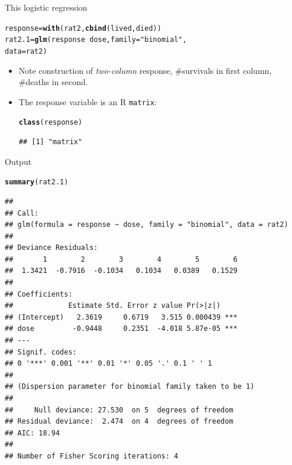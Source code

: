 \documentclass[unknownkeysallowed]{beamer}\usepackage[]{graphicx}\usepackage[]{color}
\makeatletter
\newcommand{\hlstr}[1]{\textcolor[rgb]{0.192,0.494,0.8}{#1}}%
\newcommand{\hlopt}[1]{\textcolor[rgb]{0,0,0}{#1}}%
\newcommand{\hlstd}[1]{\textcolor[rgb]{0.345,0.345,0.345}{#1}}%
\newcommand{\hlkwb}[1]{\textcolor[rgb]{0.69,0.353,0.396}{#1}}%
\newcommand{\hlkwc}[1]{\textcolor[rgb]{0.333,0.667,0.333}{#1}}%
\newcommand{\hlkwd}[1]{\textcolor[rgb]{0.737,0.353,0.396}{\textbf{#1}}}%
\newenvironment{kframe}{%
 \def\at@end@of@kframe{}%
 \ifinner\ifhmode%
  \def\at@end@of@kframe{\end{minipage}}%
  \begin{minipage}{\columnwidth}%
 \fi\fi%
 \def\FrameCommand##1{\hskip\@totalleftmargin \hskip-\fboxsep
 \colorbox{shadecolor}{##1}\hskip-\fboxsep
     \hskip-\linewidth \hskip-\@totalleftmargin \hskip\columnwidth}%
 \MakeFramed {\advance\hsize-\width
   \@totalleftmargin\z@ \linewidth\hsize
   \@setminipage}}%
 {\par\unskip\endMakeFramed%
 \at@end@of@kframe}
\newenvironment{knitrout}{}{} %
\makeatother
\begin{document}
\begin{frame}[fragile]{This logistic regression}
  
\begin{knitrout}
\color{fgcolor}\begin{kframe}
\begin{alltt}
\hlstd{response}\hlkwb{=}\hlkwd{with}\hlstd{(rat2,}\hlkwd{cbind}\hlstd{(lived,died))}
\hlstd{rat2.1}\hlkwb{=}\hlkwd{glm}\hlstd{(response}\hlopt{~}\hlstd{dose,}\hlkwc{family}\hlstd{=}\hlstr{"binomial"}\hlstd{,}
  \hlkwc{data}\hlstd{=rat2)}
\end{alltt}
\end{kframe}
\end{knitrout}
\begin{itemize}
\item Note construction of \emph{two-column} response, \#survivals in
  first column, \#deaths in second.
\item The response variable is an R \texttt{matrix}:
  
\begin{knitrout}
\color{fgcolor}\begin{kframe}
\begin{alltt}
\hlkwd{class}\hlstd{(response)}
\end{alltt}
\begin{verbatim}
## [1] "matrix"
\end{verbatim}
\end{kframe}
\end{knitrout}
\end{itemize}
  
\end{frame}

\begin{frame}[fragile]{Output}

\begin{knitrout}\scriptsize
{}\color{fgcolor}\begin{kframe}
\begin{alltt}
\hlkwd{summary}\hlstd{(rat2.1)}
\end{alltt}
\begin{verbatim}
## 
## Call:
## glm(formula = response ~ dose, family = "binomial", data = rat2)
## 
## Deviance Residuals: 
##       1        2        3        4        5        6  
##  1.3421  -0.7916  -0.1034   0.1034   0.0389   0.1529  
## 
## Coefficients:
##             Estimate Std. Error z value Pr(>|z|)    
## (Intercept)   2.3619     0.6719   3.515 0.000439 ***
## dose         -0.9448     0.2351  -4.018 5.87e-05 ***
## ---
## Signif. codes:  
## 0 '***' 0.001 '**' 0.01 '*' 0.05 '.' 0.1 ' ' 1
## 
## (Dispersion parameter for binomial family taken to be 1)
## 
##     Null deviance: 27.530  on 5  degrees of freedom
## Residual deviance:  2.474  on 4  degrees of freedom
## AIC: 18.94
## 
## Number of Fisher Scoring iterations: 4
\end{verbatim}
\end{kframe}
\end{knitrout}
  

\end{frame}
\end{document}
